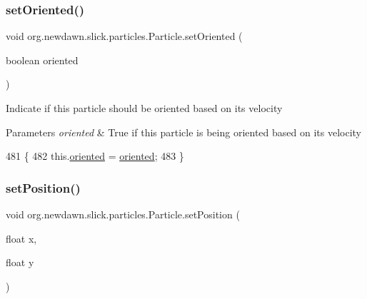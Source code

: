 \subsubsection{\texorpdfstring{set\+Oriented()}{setOriented()}}
{\footnotesize\ttfamily void org.\+newdawn.\+slick.\+particles.\+Particle.\+set\+Oriented (\begin{DoxyParamCaption}\item[{boolean}]{oriented }\end{DoxyParamCaption})\hspace{0.3cm}{\ttfamily [inline]}}

Indicate if this particle should be oriented based on it\textquotesingle{}s velocity


\begin{DoxyParams}{Parameters}
{\em oriented} & True if this particle is being oriented based on it\textquotesingle{}s velocity \\
\hline
\end{DoxyParams}

\begin{DoxyCode}
481                                               \{
482         this.\mbox{\hyperlink{classorg_1_1newdawn_1_1slick_1_1particles_1_1_particle_ad5b898bd35ce1b209c5f6372b1667fc2}{oriented}} = \mbox{\hyperlink{classorg_1_1newdawn_1_1slick_1_1particles_1_1_particle_ad5b898bd35ce1b209c5f6372b1667fc2}{oriented}};
483     \}
\end{DoxyCode}
\mbox{\label{classorg_1_1newdawn_1_1slick_1_1particles_1_1_particle_a7aaea03869505913dca81dd0c23a208f}} 
\subsubsection{\texorpdfstring{set\+Position()}{setPosition()}}
{\footnotesize\ttfamily void org.\+newdawn.\+slick.\+particles.\+Particle.\+set\+Position (\begin{DoxyParamCaption}\item[{float}]{x,  }\item[{float}]{y }\end{DoxyParamCaption})\hspace{0.3cm}{\ttfamily [inline]}}

